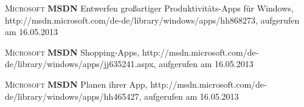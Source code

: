 \begin{thebibliography}{---}
            \textsc{Microsoft}
           \textbf{MSDN}
           Entwerfen großartiger Produktivitäts-Apps für Windows, http://msdn.microsoft.com/de-de/library/windows/apps/hh868273, aufgerufen am 16.05.2013
           
              \textsc{Microsoft}
             \textbf{MSDN}
             Shopping-Apps, http://msdn.microsoft.com/de-de/library/windows/apps/jj635241.aspx, aufgerufen am 16.05.2013
             
                \textsc{Microsoft}
               \textbf{MSDN}
 Planen ihrer App, http://msdn.microsoft.com/de-de/library/windows/apps/hh465427, aufgerufen am 16.05.2013

 
\end{thebibliography}

